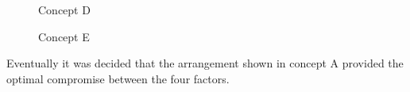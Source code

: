 \documentclass[journal,10pt]{IEEEtran}
\begin{document}
        \begin{figure}[H]
                \centering
                \caption{Concept D}
                \label{Fig:ConceptD}
            \end{figure} 
        \begin{figure}[H]
                \centering
                \caption{Concept E}
                \label{Fig:ConceptE}
            \end{figure}
        Eventually it was decided that the arrangement shown in concept A provided the optimal compromise between the four factors.
\end{document}
